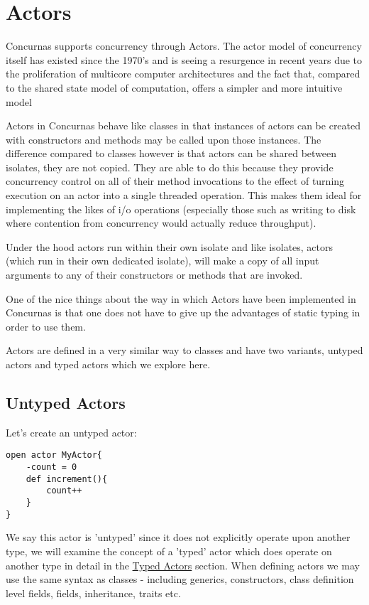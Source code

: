 \documentclass[conc-doc]{subfiles}
\begin{document}
\section{Actors}
\label{sec:actors}
Concurnas supports concurrency through Actors. The actor model of concurrency itself has existed since the 1970's and is seeing a resurgence in recent years due to the proliferation of multicore computer architectures and the fact that, compared to the shared state model of computation, offers a simpler and more intuitive model

Actors in Concurnas behave like classes in that instances of actors can be created with constructors and methods may be called upon those instances. The difference compared to classes however is that actors can be shared between isolates, they are not copied. They are able to do this because they provide concurrency control on all of their method invocations to the effect of turning execution on an actor into a single threaded operation. This makes them ideal for implementing the likes of i/o operations (especially those such as writing to disk where contention from concurrency would actually reduce throughput).

Under the hood actors run within their own isolate and like isolates, actors (which run in their own dedicated isolate), will make a copy of all input arguments to any of their constructors or methods that are invoked. 

One of the nice things about the way in which Actors have been implemented in Concurnas is that one does not have to give up the advantages of static typing in order to use them.

Actors are defined in a very similar way to classes and have two variants, untyped actors and typed actors which we explore here.

\subsection{Untyped Actors}
Let's create an untyped actor:

\begin{lstlisting}
open actor MyActor{
	-count = 0
	def increment(){
		count++
	}
}
\end{lstlisting}

We say this actor is 'untyped' since it does not explicitly operate upon another type, we will examine the concept of a 'typed' actor which does operate on another type in detail in the \hyperref[subsec:typedactors]{Typed Actors} section. When defining actors we may use the same syntax as classes - including generics, constructors, class definition level fields, fields, inheritance, traits etc.
\end{document}

